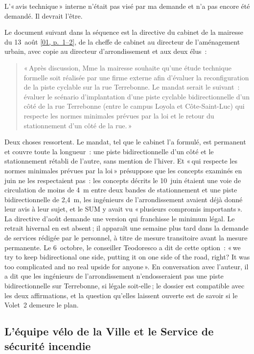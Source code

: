 \documentclass[11pt,letterpaper]{article}
\newcommand{\pagesurl}{https://openmobilitydata.github.io/Terrebonne-access-requests}
\newcommand{\pgl}[3]{\href{\pagesurl/\csname bundle#1\endcsname\#page=#2}{\textsf{\small[#1, p.~#3]}}}
\newcommand{\quot}[1]{\begin{quote}\small #1\end{quote}}
\begin{document}
L'«\,avis technique\,» interne n'était pas visé par ma demande et n'a pas
encore été demandé. Il devrait l'être.

Le document suivant dans la séquence est la directive du cabinet de la
mairesse du 13~août \pgl{01}{1}{1--2}, de la cheffe de cabinet au directeur
de l'aménagement urbain, avec copie au directeur d'arrondissement et aux
deux élus~:

\quot{«\,Après discussion, Mme la mairesse souhaite qu'une étude technique
formelle soit réalisée par une firme externe afin d'évaluer la
reconfiguration de la piste cyclable sur la rue Terrebonne. Le mandat serait
le suivant~: évaluer le scénario d'implantation d'une piste cyclable
bidirectionnelle d'un côté de la rue Terrebonne (entre le campus Loyola
et Côte-Saint-Luc) qui respecte les normes minimales prévues par la loi
et le retour du stationnement d'un côté de la rue.\,»}

Deux choses ressortent. Le mandat, tel que le cabinet l'a formulé, est
permanent et couvre toute la longueur~: une piste bidirectionnelle d'un
côté et le stationnement rétabli de l'autre, sans mention de l'hiver. Et
«\,qui respecte les normes minimales prévues par la loi\,» présuppose que les
concepts examinés en juin ne les respectaient pas~: les concepts décrits le
10~juin étaient une voie de circulation de moins de 4~m entre deux bandes de
stationnement et une piste bidirectionnelle de 2,4~m, les ingénieurs de
l'arrondissement avaient déjà donné leur avis à leur sujet, et le SUM y
avait vu «\,plusieurs compromis importants\,». La directive d'août demande
une version qui franchisse le minimum légal. Le retrait hivernal en est
absent\,; il apparaît une semaine plus tard dans la demande de services
rédigée par le personnel, à titre de mesure transitoire avant la mesure
permanente. Le 6~octobre, le conseiller Teodoresco a dit de cette
option~: «\,we try to keep bidirectional one side, putting it on one side
of the road, right? It was too complicated and no real upside for
anyone\,». En conversation avec l'auteur, il a dit que les ingénieurs de
l'arrondissement n'endosseraient pas une piste bidirectionnelle sur
Terrebonne, si légale soit-elle\,; le dossier est compatible avec les deux
affirmations, et la question qu'elles laissent ouverte est de savoir si le
Volet~2 demeure le plan.

\subsection{L'équipe vélo de la Ville et le Service de sécurité incendie}
\end{document}
